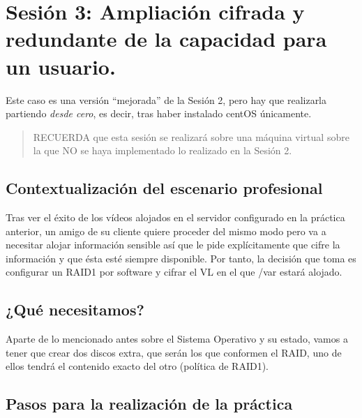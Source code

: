 \documentclass[
]{memoir}
\begin{document}
\hypertarget{sesiuxf3n-3-ampliaciuxf3n-cifrada-y-redundante-de-la-capacidad-para-un-usuario.}{%
\section{Sesión 3: Ampliación cifrada y redundante de la capacidad para un usuario.}\label{sesiuxf3n-3-ampliaciuxf3n-cifrada-y-redundante-de-la-capacidad-para-un-usuario.}}

Este caso es una versión ``mejorada'' de la Sesión 2, pero hay que realizarla partiendo \emph{desde cero}, es decir, tras haber instalado centOS únicamente.

\begin{quote}
RECUERDA que esta sesión se realizará sobre una máquina virtual sobre la que NO se haya implementado lo realizado en la Sesión 2.
\end{quote}

\hypertarget{contextualizaciuxf3n-del-escenario-profesional-1}{%
\subsection{Contextualización del escenario profesional}\label{contextualizaciuxf3n-del-escenario-profesional-1}}

Tras ver el éxito de los vídeos alojados en el servidor configurado en la práctica anterior, un amigo de su cliente quiere proceder del mismo modo pero va a necesitar alojar información sensible así que le pide explícitamente que cifre la información y que ésta esté siempre disponible. Por tanto, la decisión que toma es configurar un RAID1 por software y cifrar el VL en el que /var estará alojado.

\hypertarget{quuxe9-necesitamos}{%
\subsection{¿Qué necesitamos?}\label{quuxe9-necesitamos}}

Aparte de lo mencionado antes sobre el Sistema Operativo y su estado, vamos a tener que crear dos discos extra, que serán los que conformen el RAID, uno de ellos tendrá el contenido exacto del otro (política de RAID1).

\hypertarget{pasos-para-la-realizaciuxf3n-de-la-pruxe1ctica}{%
\subsection{Pasos para la realización de la práctica}\label{pasos-para-la-realizaciuxf3n-de-la-pruxe1ctica}}
\end{document}
